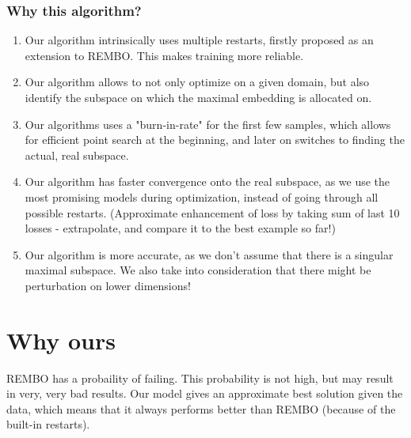 \subsubsection{Why this algorithm?}

\begin{enumerate}
\item Our algorithm intrinsically uses multiple restarts, firstly proposed as an extension to REMBO.
This makes training more reliable.
\item Our algorithm allows to not only optimize on a given domain, but also identify the subspace on which the maximal embedding is allocated on.
\item Our algorithms uses a "burn-in-rate" for the first few samples, which allows for efficient point search at the beginning, and later on switches to finding the actual, real subspace.
\item Our algorithm has faster convergence onto the real subspace, as we use the most promising models during optimization, instead of going through all possible restarts. (Approximate enhancement of loss by taking sum of last 10 losses - extrapolate, and compare it to the best example so far!)
\item Our algorithm is more accurate, as we don't assume that there is a singular maximal subspace. 
We also take into consideration that there might be perturbation on lower dimensions!
\end{enumerate}







\section{Why ours}
REMBO has a probaility of failing. This probability is not high, but may result in very, very bad results. 
Our model gives an approximate best solution given the data, which means that it always performs better than REMBO (because of the built-in restarts).


